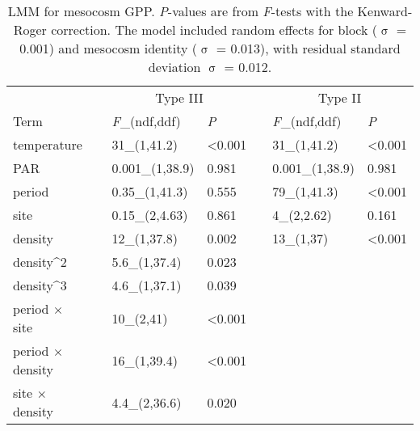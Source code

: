 \documentclass[12pt]{article}
\begin{document}

\clearpage



\clearpage







\begin{table}
\caption{\label{tab:gpp}
LMM for mesocosm GPP. 
\emph{P}-values are from \emph{F}-tests with the Kenward-Roger correction.
The model included random effects for block ($\upsigma$ = 0.001)
and mesocosm identity ($\upsigma$ = 0.013), 
with residual standard deviation $\upsigma$ = 0.012.}
\setlength{\tabcolsep}{12pt}
\begin{tabular}{lllllll}
\toprule
& & \multicolumn{2}{c}{Type III} & & \multicolumn{2}{c}{Type II} \\
\cmidrule{3-4} \cmidrule{6-7}
Term & & \emph{F}_{(ndf,ddf)} & \emph{P} & & \emph{F}_{(ndf,ddf)} & \emph{P}\\
\midrule
temperature & & 31_{(1,41.2)} & <0.001 & & 31_{(1,41.2)} & <0.001\\

PAR & & 0.001_{(1,38.9)} & 0.981 & & 0.001_{(1,38.9)} & 0.981\\

period & & 0.35_{(1,41.3)} & 0.555 & & 79_{(1,41.3)} & <0.001\\

site & & 0.15_{(2,4.63)} & 0.861 & & 4_{(2,2.62)} & 0.161\\

density & & 12_{(1,37.8)} & 0.002 & & 13_{(1,37)} & <0.001\\

density^2 & & 5.6_{(1,37.4)} & 0.023 & &  & \\

density^3  & & 4.6_{(1,37.1)} & 0.039 & & & \\

period $\times$ site & & 10_{(2,41)} & <0.001 & & & \\

period $\times$ density & & 16_{(1,39.4)} & <0.001 & & & \\

site $\times$ density & & 4.4_{(2,36.6)} & 0.020 & & & \\
\bottomrule
\end{tabular}
\end{table}
\end{document}
